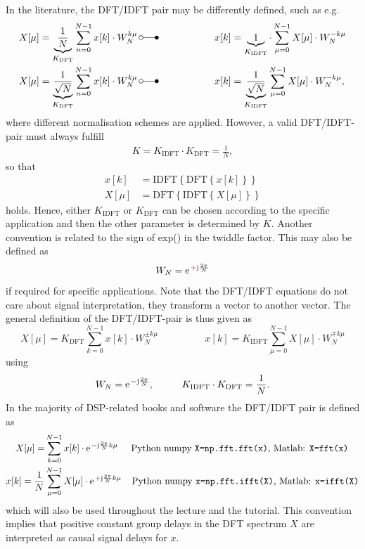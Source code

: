 \documentclass[11pt,a4paper,DIV=12]{scrartcl}
\newcommand{\red}{\textcolor{red}}
\begin{document}
In the literature, the DFT/IDFT pair may be differently defined, such as e.g.
\begin{align}
&X[\mu]=\underbrace{{\frac{1}{N}}}_{K_\text{DFT}}\sum_{n=0}^{N-1}x[k]\cdot W_N^{k\mu}
\,\laplace\hspace{2cm}
x[k]=\underbrace{{1}}_{K_\text{IDFT}}\cdot\sum_{\mu=0}^{N-1}X[\mu]\cdot W_N^{-k\mu}\\
&X[\mu]=\underbrace{{\frac{1}{\sqrt{N}}}}_{K_\text{DFT}}\sum_{n=0}^{N-1}x[k]\cdot W_N^{k\mu}
\,\laplace\hspace{2cm}
x[k]=\underbrace{{\frac{1}{\sqrt{N}}}}_{K_\text{IDFT}}\sum_{\mu=0}^{N-1}X[\mu]\cdot W_N^{-k\mu},
\label{eq:orthonorm}
\end{align}
where different normalisation schemes are applied.
%
However, a valid DFT/IDFT-pair must always fulfill
\begin{align}
K=K_{\text{IDFT}}\cdot K_{\text{DFT}}=\frac{1}{N},
\end{align}
so that
\begin{align}
x[k]&=\text{IDFT}\left\{\text{DFT}\left\{x[k]\right\}\right\}
\label{eq:x_idft_dft_x}
\\
X[\mu]&=\text{DFT}\left\{\text{IDFT}\left\{X[\mu]\right\}\right\}
\label{eq:X_dft_idft_X}
\end{align}
holds.
%
Hence, either $K_{\text{IDFT}}$ or $K_{\text{DFT}}$ can be chosen according to
the specific application and then the other parameter is determined by $K$.
%
Another convention is related to the sign of exp() in the twiddle factor.
%
This may also be defined as
\begin{equation}
W_N=\e^{\red{+}\im\frac{2\pi}{N}}
\end{equation}
if required for specific applications.
%
Note that the DFT/IDFT equations do not care about signal interpretation, they
transform a vector to another vector.
%
The general definition of the DFT/IDFT-pair is thus given as
\begin{equation}
X[\mu]=K_\text{DFT}\sum_{k=0}^{N-1}x[k]\cdot W_N^{\pm k\mu}
\hspace{2cm}
x[k]=K_\text{IDFT}\sum_{\mu=0}^{N-1}X[\mu]\cdot W_N^{\mp k\mu}
\end{equation}
using
\begin{equation}
W_N=\e^{-\im\frac{2\pi}{N}},
\hspace{1cm}
K_\text{IDFT}\cdot K_\text{DFT}=\frac{1}{N}.
\end{equation}
%
In the majority of DSP-related books and software the DFT/IDFT pair is defined
as
\begin{align}
X[\mu]=&\sum_{k=0}^{N-1}x[k]\cdot\e^{-\im\frac{2\pi}{N}k\mu}
\hspace{0.5cm}
\text{Python numpy \texttt{X=np.fft.fft(x)}, Matlab: \texttt{X=fft(x)}}
\label{eq:DFT}\\
x[k]=\frac{1}{N}&\sum_{\mu=0}^{N-1}X[\mu]\cdot\e^{+\im\frac{2\pi}{N}k\mu}
\hspace{0.4cm}
\text{Python numpy \texttt{x=np.fft.ifft(X)}, Matlab: \texttt{x=ifft(X)}}
\label{eq:IDFT}
\end{align}
which will also be used throughout the lecture and the tutorial.
%
This convention implies that positive constant group delays in the DFT spectrum
$X$ are interpreted as causal signal delays for $x$.
\end{document}
